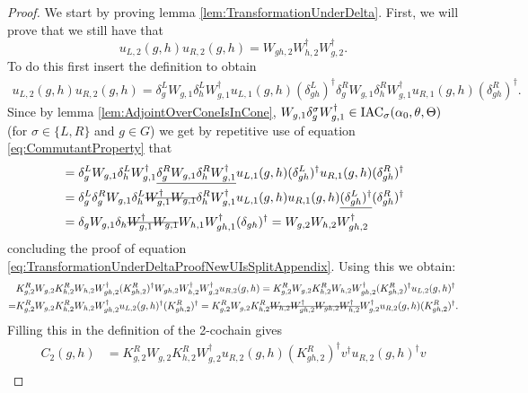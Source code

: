\documentclass[11pt,a4paper,twoside]{article}
\numberwithin{equation}{section}
\begin{document}
	\begin{proof}
		We start by proving lemma \ref{lem:TransformationUnderDelta}. First, we will prove that we still have that
		\begin{equation}\label{eq:TransformationUnderDeltaProofNewUIsSplitAppendix}
			u_{L,2}(g,h)u_{R,2}(g,h)=W_{gh,2}W_{h,2}^\dagger W_{g,2}^\dagger.
		\end{equation}
		To do this first insert the definition to obtain
		\begin{align}
			u_{L,2}(g,h)u_{R,2}(g,h)=\delta_g^L W_{g,1}\delta_h^L W_{g,1}^\dagger u_{L,1}(g,h)(\delta_{gh}^L)^\dagger \delta_g^R W_{g,1}\delta_h^R W_{g,1}^\dagger u_{R,1}(g,h)(\delta_{gh}^R)^\dagger.
		\end{align}
		Since by lemma \ref{lem:AdjointOverConeIsInCone}, $ W_{g,1}\delta_g^\sigma W_{g,1}^\dagger\in\textrm{IAC}_\sigma(\alpha_0,\theta,\Theta)$ (for $\sigma\in\{L,R\}$ and $g\in G$) we get by repetitive use of equation \eqref{eq:CommutantProperty} that
		\begin{align}
			&=\delta_g^L W_{g,1}\delta_h^L W_{g,1}^\dagger \underline{\delta_g^R W_{g,1}\delta_h^R W_{g,1}^\dagger} u_{L,1}(g,h)(\delta_{gh}^L)^\dagger  u_{R,1}(g,h)(\delta_{gh}^R)^\dagger\\
			\nonumber
			&=\delta_g^L \delta_g^R W_{g,1}\delta_h^L \stkout{ W_{g,1}^\dagger W_{g,1}}\delta_h^R W_{g,1}^\dagger u_{L,1}(g,h)  u_{R,1}(g,h)\underline{(\delta_{gh}^L)^\dagger}(\delta_{gh}^R)^\dagger\\
			\nonumber
			&=\delta_g W_{g,1}\delta_h \stkout{W_{g,1}^\dagger W_{g,1}} W_{h,1} W_{gh,1}^\dagger(\delta_{gh})^\dagger=W_{g,2}W_{h,2}W_{gh,2}^\dagger
		\end{align}
		concluding the proof of equation \eqref{eq:TransformationUnderDeltaProofNewUIsSplitAppendix}. Using this we obtain:
		\begin{align}
			&K_{g,2}^RW_{g,2}K_{h,2}^{R}W_{h,2}W_{gh,2}^\dagger(K_{gh,2}^R)^\dagger W_{gh,2}W_{h,2}^\dagger W_{g,2}^\dagger u_{R,2}(g,h)=K_{g,2}^RW_{g,2}K_{h,2}^{R}W_{h,2}W_{gh,2}^\dagger(K_{gh,2}^R)^\dagger u_{L,2}(g,h)^\dagger\\
			=&K_{g,2}^RW_{g,2}K_{h,2}^{R}W_{h,2}W_{gh,2}^\dagger u_{L,2}(g,h)^\dagger (K_{gh,2}^R)^\dagger=K_{g,2}^RW_{g,2}K_{h,2}^{R}\stkout{W_{h,2}W_{gh,2}^\dagger W_{gh,2}W_{h,2}^\dagger} W_{g,2}^\dagger u_{R,2}(g,h) (K_{gh,2}^R)^\dagger.
		\end{align}
		Filling this in the definition of the 2-cochain gives
		\begin{align}
			\nonumber
			C_2(g,h)&=K_{g,2}^RW_{g,2}K_{h,2}^{R}W_{g,2}^\dagger u_{R,2}(g,h) (K_{gh,2}^R)^\dagger v^\dagger u_{R,2}(g,h)^\dagger v\\

\end{align}
\end{proof}
\end{document}
